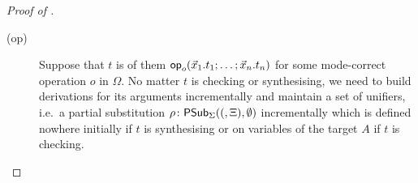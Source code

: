 \begin{proof}[Proof of {}]
\begin{description}
    \item[(op)]
      Suppose that $t$ is of them $\mathsf{op}_o(\vec{x}_1.t_1; \ldots; \vec{x}_n.t_n)$ for some mode-correct operation $o$ in $\Omega$.
      No matter $t$ is checking or synthesising, we need to build derivations for its arguments incrementally and maintain a set of unifiers, i.e.\ a partial substitution $\rho\colon \mathsf{PSub}_{\Sigma}((,\Xi), \emptyset)$ incrementally which is defined nowhere initially if $t$ is synthesising or on variables of the target $A$ if $t$ is checking. 

  \end{description}
\end{proof}
